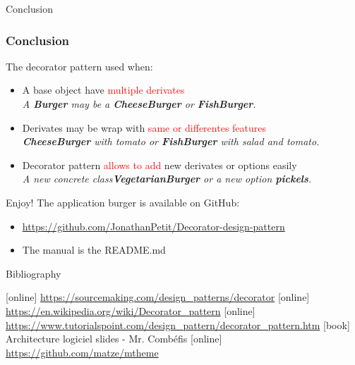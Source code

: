 \documentclass{beamer}
\begin{document}
  \begin{frame}{Conclusion}
    \frametitle{Conclusion}
    The decorator pattern used when:
    \begin{itemize}
      \item A base object have \textcolor{red}{multiple derivates} \\
      \textit{A \textbf{Burger} may be a \textbf{CheeseBurger} or \textbf{FishBurger}.}
      \item Derivates may be wrap with \textcolor{red}{same or differentes features} \\
      \textit{\textbf{CheeseBurger} with tomato or \textbf{FishBurger} with salad and tomato.}
      \item Decorator pattern \textcolor{red}{allows to add} new derivates or options easily \\
      \textit{A new concrete class\textbf{VegetarianBurger} or a new option \textbf{pickels}.}
    \end{itemize}
  \end{frame}

  \appendix

  \begin{frame}{Enjoy!}
    The application burger is available on GitHub:
    \begin{itemize}
      \item \url{https://github.com/JonathanPetit/Decorator-design-pattern}
      \item The manual is the README.md
    \end{itemize}
  \end{frame}

  \begin{frame}[allowframebreaks]{Bibliography}
    \begin{thebibliography}{9}
      [online]
       \url{https://sourcemaking.com/design_patterns/decorator}
      [online]
       \url{https://en.wikipedia.org/wiki/Decorator_pattern}
      [online]
       \url{https://www.tutorialspoint.com/design_pattern/decorator_pattern.htm}
      [book]
       Architecture logiciel slides - Mr. Comb\'efis
      [online]
       \url{https://github.com/matze/mtheme}

    \end{thebibliography}
  \end{frame}
\end{document}
